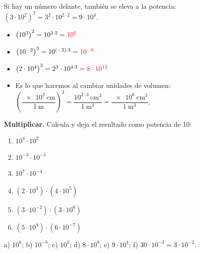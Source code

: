 Si hay un número delante, también se eleva a la potencia: \(\left(3 \cdot 10^{2}\right)^{2} = 3^{2} \cdot 10^{2 \cdot 2} = 9 \cdot 10^{4}\).

\begin{example}
    \begin{itemize}
        \item \(\left(10^{3}\right)^{2} = 10^{3 \cdot 2} = \textcolor{red}{10^{6}}\)
        \item \(\left(10^{-2}\right)^{3} = 10^{(-2) \cdot 3} = \textcolor{red}{10^{-6}}\)
        \item \(\left(2 \cdot 10^{4}\right)^{3} = 2^{3} \cdot 10^{4 \cdot 3} = \textcolor{red}{8 \cdot 10^{12}}\)
        \item Es lo que hacemos al cambiar unidades de volumen: \(\left(\dfrac{\qty{e2}{\cm}}{\qty{1}{\m}}\right)^{3} = \dfrac{10^{2 \cdot 3}\,\unit{\cubic\cm}}{\qty{1}{\cubic\m}} = \dfrac{\qty{e6}{\cubic\cm}}{\qty{1}{\cubic\m}}\).
    \end{itemize}
\end{example}

\begin{exercise}
    \textbf{Multiplicar.} Calcula y deja el resultado como potencia de 10:
    \begin{enumerate}[label=\letraminuscula]
        \item \(10^{4} \cdot 10^{2}\)
        \item \(10^{-3} \cdot 10^{-5}\)
        \item \(10^{7} \cdot 10^{-4}\)
        \item \((2 \cdot 10^{3}) \cdot (4 \cdot 10^{5})\)
        \item \((3 \cdot 10^{-2}) \cdot (3 \cdot 10^{6})\)
        \item \((5 \cdot 10^{4}) \cdot (6 \cdot 10^{-7})\)
    \end{enumerate}
    \begin{solu}
        a) \(10^{6}\); b) \(10^{-8}\); c) \(10^{3}\); d) \(8 \cdot 10^{8}\); e) \(9 \cdot 10^{4}\); f) \(30 \cdot 10^{-3} = 3 \cdot 10^{-2}\).
    \end{solu}
\end{exercise}

